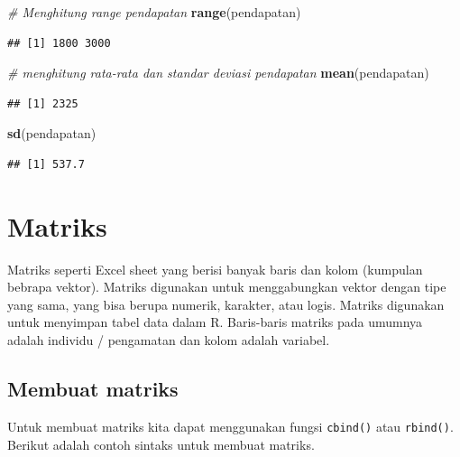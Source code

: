 \documentclass[]{book}
\newenvironment{Shaded}{\begin{snugshade}}{\end{snugshade}}
\newcommand{\KeywordTok}[1]{\textcolor[rgb]{0.13,0.29,0.53}{\textbf{#1}}}
\newcommand{\CommentTok}[1]{\textcolor[rgb]{0.56,0.35,0.01}{\textit{#1}}}
\newcommand{\NormalTok}[1]{#1}
\begin{document}
\begin{Shaded}
\begin{Highlighting}[]
\CommentTok{# Menghitung range pendapatan}
\KeywordTok{range}\NormalTok{(pendapatan)}
\end{Highlighting}
\end{Shaded}

\begin{verbatim}
## [1] 1800 3000
\end{verbatim}

\begin{Shaded}
\begin{Highlighting}[]
\CommentTok{# menghitung rata-rata dan standar deviasi pendapatan}
\KeywordTok{mean}\NormalTok{(pendapatan)}
\end{Highlighting}
\end{Shaded}

\begin{verbatim}
## [1] 2325
\end{verbatim}

\begin{Shaded}
\begin{Highlighting}[]
\KeywordTok{sd}\NormalTok{(pendapatan)}
\end{Highlighting}
\end{Shaded}

\begin{verbatim}
## [1] 537.7
\end{verbatim}

\section{Matriks}\label{matriks}

Matriks seperti Excel sheet yang berisi banyak baris dan kolom (kumpulan
bebrapa vektor). Matriks digunakan untuk menggabungkan vektor dengan
tipe yang sama, yang bisa berupa numerik, karakter, atau logis. Matriks
digunakan untuk menyimpan tabel data dalam R. Baris-baris matriks pada
umumnya adalah individu / pengamatan dan kolom adalah variabel.

\subsection{Membuat matriks}\label{membuat-matriks}

Untuk membuat matriks kita dapat menggunakan fungsi \texttt{cbind()}
atau \texttt{rbind()}. Berikut adalah contoh sintaks untuk membuat
matriks.
\end{document}
